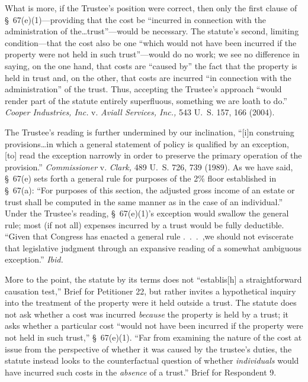   What is more, if the Trustee's position were correct, then only the first clause of \S~67(e)(1)---providing that the cost be ``incurred in connection with the administration of the\dots trust''---would be necessary. The statute's second, limiting condition---that the cost also be one ``which would not have been incurred if the property were not held in such trust''---would do no work; we see no difference in saying, on the one hand, that costs are ``caused by'' the fact that the property is held in trust and, on the other, that costs are incurred ``in connection with the administration'' of the trust. Thus, accepting the Trustee's approach ``would render part of the statute entirely superfluous, something we are loath to do.'' \emph{Cooper Industries, Inc.} v. \emph{Aviall Services, Inc.,} 543 U.~S. 157, 166 (2004).

  The Trustee's reading is further undermined by our inclination, ``[i]n construing provisions\dots in which a general statement of policy is qualified by an exception, [to] read the exception narrowly in order to preserve the primary operation of the provision.'' \emph{Commissioner} v. \emph{Clark,} 489 U.~S. 726, 739 (1989). As we have said, \S~67(e) sets forth a general \newpage  rule for purposes of the 2\% floor established in \S~67(a): ``For purposes of this section, the adjusted gross income of an estate or trust shall be computed in the same manner as in the case of an individual.'' Under the Trustee's reading, \S~67(e)(1)'s exception would swallow the general rule; most (if not all) expenses incurred by a trust would be fully deductible. ``Given that Congress has enacted a general rule .~.~.~,we should not eviscerate that legislative judgment through an expansive reading of a somewhat ambiguous exception.'' \emph{Ibid.}

  More to the point, the statute by its terms does not ``establis[h] a straightforward causation test,'' Brief for Petitioner 22, but rather invites a hypothetical inquiry into the treatment of the property were it held outside a trust. The statute does not ask whether a cost was incurred \emph{because} the property is held by a trust; it asks whether a particular cost ``would not have been incurred if the property were not held in such trust,'' \S~67(e)(1). ``Far from examining the nature of the cost at issue from the perspective of whether it was caused by the trustee's duties, the statute instead looks to the counterfactual question of whether \emph{individuals} would have incurred such costs in the \emph{absence} of a trust.'' Brief for Respondent 9.

